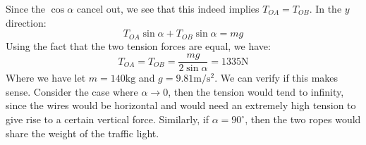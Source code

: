 \documentclass{article}
\begin{document}
Since the $\cos\alpha$ cancel out, we see that this indeed implies $T_{OA}=T_{OB}$. In the $y$ direction:
\begin{equation}
    T_{OA}\sin\alpha+T_{OB}\sin\alpha=mg
    \label{eq:}
\end{equation}
Using the fact that the two tension forces are equal, we have:
\begin{equation}
    \boxed{T_{OA}=T_{OB} = \frac{mg}{2\sin\alpha} = 1335 \si{\newton}}
    \label{eq:4a-answer}
\end{equation}
Where we have let $m=140\si{\kilogram}$ and $g=9.81\si{\meter\per\second\squared}.$ We can verify if this makes sense. Consider the case where $\alpha\to 0$, then the tension would tend to infinity, since the wires would be horizontal and would need an extremely high tension to give rise to a certain vertical force. Similarly, if $\alpha = 90^\circ$, then the two ropes would share the weight of the traffic light.
\end{document}

